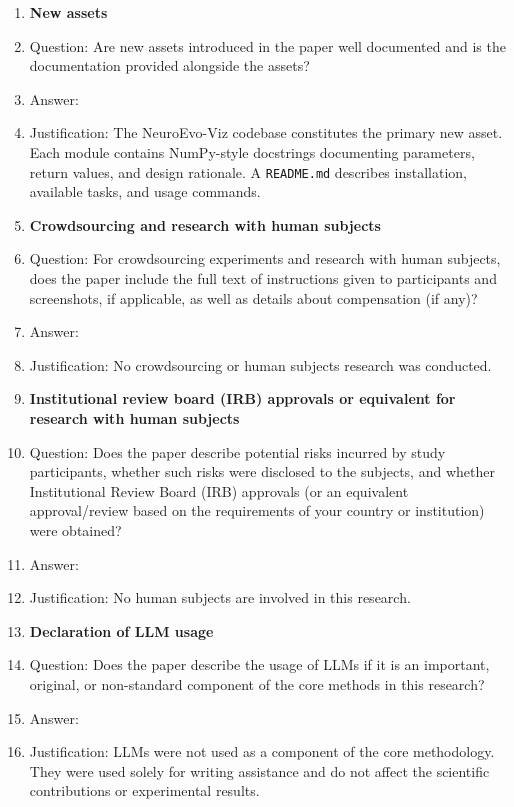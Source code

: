 \begin{enumerate}
\item {\bf New assets}
    \item[] Question: Are new assets introduced in the paper well documented and is the documentation provided alongside the assets?
    \item[] Answer: \answerYes{}
    \item[] Justification: The NeuroEvo-Viz codebase constitutes the primary new asset. Each module contains NumPy-style docstrings documenting parameters, return values, and design rationale. A \texttt{README.md} describes installation, available tasks, and usage commands.

\item {\bf Crowdsourcing and research with human subjects}
    \item[] Question: For crowdsourcing experiments and research with human subjects, does the paper include the full text of instructions given to participants and screenshots, if applicable, as well as details about compensation (if any)?
    \item[] Answer: \answerNA{}
    \item[] Justification: No crowdsourcing or human subjects research was conducted.

\item {\bf Institutional review board (IRB) approvals or equivalent for research with human subjects}
    \item[] Question: Does the paper describe potential risks incurred by study participants, whether such risks were disclosed to the subjects, and whether Institutional Review Board (IRB) approvals (or an equivalent approval/review based on the requirements of your country or institution) were obtained?
    \item[] Answer: \answerNA{}
    \item[] Justification: No human subjects are involved in this research.

\item {\bf Declaration of LLM usage}
    \item[] Question: Does the paper describe the usage of LLMs if it is an important, original, or non-standard component of the core methods in this research?
    \item[] Answer: \answerNA{}
    \item[] Justification: LLMs were not used as a component of the core methodology. They were used solely for writing assistance and do not affect the scientific contributions or experimental results.

\end{enumerate}
